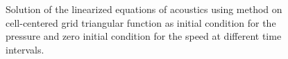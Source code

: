 \begin{figure}[]
     \caption{Solution of the linearized equations of acoustics using \protect{\lw} method on cell-centered grid triangular function as initial condition for the pressure and zero initial condition for the speed at different time intervals.}
   \label{fig:sol_tri}
\end{figure} 
      
